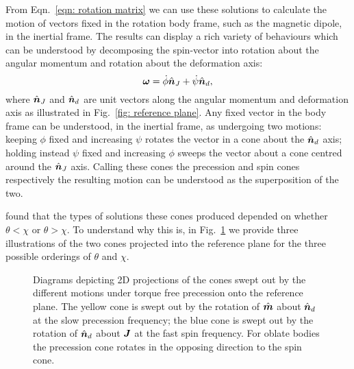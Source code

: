 \documentclass[../full_thesis/full_thesis.tex]{subfiles}
\begin{document}
From Eqn.~\eqref{eqn: rotation matrix} we can use these solutions to calculate
the motion of vectors fixed in the rotation body frame, such as the magnetic
dipole, in the inertial frame. The results can display a rich
variety of behaviours which can be understood by decomposing the
spin-vector into rotation about the angular momentum and rotation about the
deformation axis:
\begin{equation}
  \boldsymbol{\omega} = \dot{\phi}\hat{\boldsymbol{n}}_{J} + \dot{\psi}\hat{\boldsymbol{n}}_{d},
\label{eqn: decomp}
\end{equation}
where $\hat{\boldsymbol{n}}_J$ and $\hat{\boldsymbol{n}}_d$ are unit vectors along the angular momentum and deformation
axis as illustrated in Fig.~\ref{fig: reference plane}.
Any fixed vector in the body frame can be understood, in the inertial frame, as
undergoing two motions: keeping $\phi$ fixed and increasing $\psi$ rotates the
vector in a cone about the $\hat{\boldsymbol{n}}_{d}$ axis; holding instead $\psi$ fixed and
increasing $\phi$ sweeps the vector about a cone centred around the $\hat{\boldsymbol{n}}_{J}$
axis. Calling these cones the precession and spin cones respectively the
resulting motion can be understood as the superposition of the two.

\citet{Jones2001} found that the types of solutions these cones produced
depended on whether $\theta < \chi$ or $\theta > \chi$. To understand why this is, in
Fig.~\ref{fig: cones} we provide three illustrations of the two cones projected
into the reference plane for the three possible orderings of $\theta$ and $\chi$.
\begin{figure}[ht]
\centering
\caption{Diagrams depicting 2D projections of the cones swept out by the
    different motions under torque free precession onto the reference plane.
    The yellow cone is swept out by the rotation of $\hat{\boldsymbol{m}}$ about $\hat{\boldsymbol{n}}_{d}$ at the
    slow precession frequency; the blue cone is swept out by the rotation of
    $\hat{\boldsymbol{n}}_{d}$ about $\boldsymbol{J}$ at the fast spin frequency. For oblate bodies the
precession cone rotates in the opposing direction to the spin cone.}
\label{fig: cones}
\end{figure}
\end{document}
